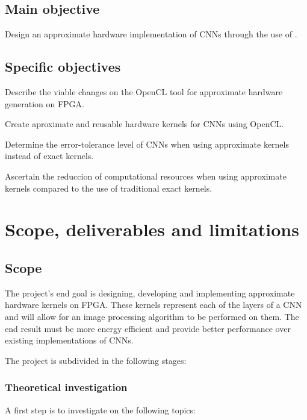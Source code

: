 \subsection{Main objective}

Design an approximate hardware implementation of CNNs through the 
use of \intelOCL.

\subsection{Specific objectives}

\begin{compactitem}
    \item Describe the viable changes on the OpenCL tool for approximate hardware generation on FPGA.
    \item Create aproximate and reusable hardware kernels for CNNs using OpenCL.
    \item Determine the error-tolerance level of CNNs when using approximate kernels instead of exact kernels.
    \item Ascertain the reduccion of computational resources when using approximate kernels compared to the use of traditional exact kernels.
\end{compactitem}

\section{Scope, deliverables and limitations}

\subsection{Scope}

The project's end goal is designing, developing and implementing approximate hardware kernels on FPGA.
These kernels represent each of the layers of a CNN and will allow for an image processing algorithm to be
performed on them. The end result must be more energy efficient and provide better performance over existing
implementations of CNNs.

The project is subdivided in the following stages:

\subsubsection{Theoretical investigation}

A first step is to investigate on the following topics:

